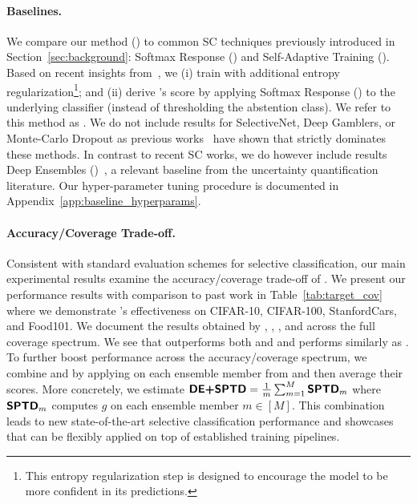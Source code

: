 \paragraph{Baselines.} We compare our method (\sptd) to common SC techniques previously introduced in Section~\ref{sec:background}: Softmax Response (\sr) and Self-Adaptive Training (\sat). Based on recent insights from~\cite{feng2023towards}, we (i) train \sat with additional entropy regularization\footnote{This entropy regularization step is designed to encourage the model to be more confident in its predictions.}; and (ii) derive \sat's score by applying Softmax Response (\sr) to the underlying classifier (instead of thresholding the abstention class). We refer to this method as \satersr. We do not include results for SelectiveNet, Deep Gamblers, or Monte-Carlo Dropout as previous works~\citep{huang2020self,feng2023towards} have shown that \fixed{\satersr} strictly dominates these methods. In contrast to recent SC works, we do however include results  Deep Ensembles (\de)~\citep{balaji2017uncertainty}, a relevant baseline from the uncertainty quantification literature. Our hyper-parameter tuning procedure is documented in Appendix~\ref{app:baseline_hyperparams}.



\paragraph{Accuracy/Coverage Trade-off.} Consistent with standard evaluation schemes for selective classification, our main experimental results examine the accuracy/coverage trade-off of \sptd. We present our performance results with comparison to past work in Table~\ref{tab:target_cov} where we demonstrate \sptd's effectiveness on CIFAR-10, CIFAR-100, StanfordCars, and Food101. We document the results obtained by \sptd, \sat, \sr, and \de across the full coverage spectrum. 
We see that \sptd outperforms both \sat and \sr and performs similarly as \de. To further boost performance across the accuracy/coverage spectrum, we combine \sptd and \de by applying \sptd on each ensemble member from \de and then average their scores. More concretely, we estimate $\textbf{\sffamily DE+SPTD} = \frac{1}{m}\sum_{m=1}^M \textbf{\sffamily SPTD}_m$ where $\textbf{\sffamily SPTD}_m$ computes $g$ on each ensemble member $m\in[M]$. This combination leads to new state-of-the-art selective classification performance and showcases that \sptd can be flexibly applied on top of established training pipelines. 

